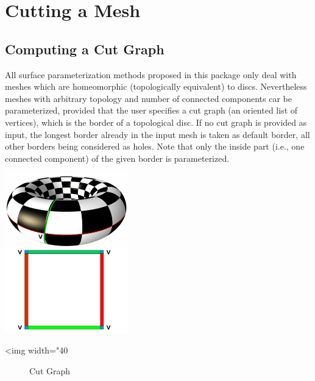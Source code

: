 \section{Cutting a Mesh}
\label{sec:Cutting-a-Mesh}

\subsection{Computing a Cut Graph}

All surface parameterization methods proposed in this package only
deal with meshes which are homeomorphic (topologically equivalent) to discs.
Nevertheless meshes with arbitrary topology and number of connected components car be parameterized, provided that the user specifies a cut graph (an oriented list of vertices), which is the border of a topological disc. If no cut graph is
provided as input, the longest border already
in the input mesh is taken as default border, all other borders being considered as holes. Note that only the inside part (i.e., one connected component) of the given border is parameterized.

\begin{center}
    \label{Surface_mesh_parameterization-fig-cut}
    \begin{ccTexOnly}
        \includegraphics[width=0.4\textwidth]{Surface_mesh_parameterization/cut} %
    \end{ccTexOnly}
    \begin{ccHtmlOnly}
        <img width="40%
    \end{ccHtmlOnly}
    \begin{figure}[h]
        \caption{Cut Graph}
    \end{figure}
\end{center}

